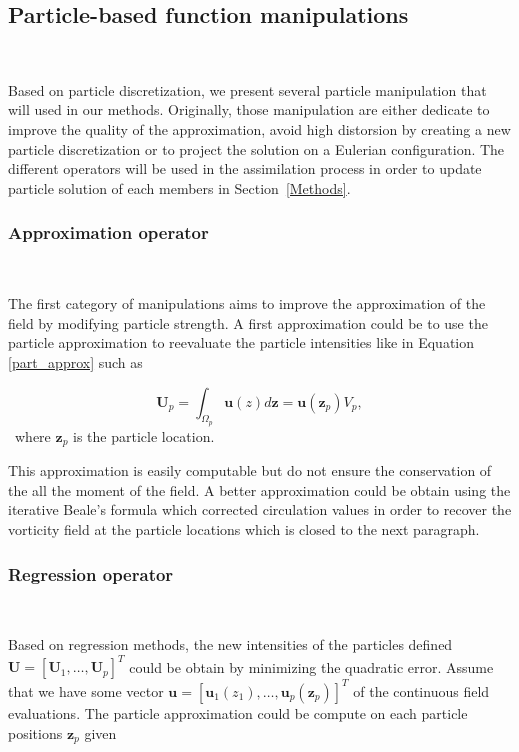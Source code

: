 \subsection{Particle-based function manipulations}~\label{operators}

Based on particle discretization, we present several particle manipulation that will used in our methods. Originally, those manipulation are either dedicate to improve the quality of the approximation, avoid high distorsion by creating a new particle discretization or to project the solution on a Eulerian configuration. The different operators will be used in the assimilation process in
order to update particle solution of each members in Section~\ref{Methods}.

\subsubsection{Approximation operator}~\label{interpOp}

The first category of manipulations aims to improve the approximation of the field by modifying particle strength.
A first approximation could be to use the particle approximation to reevaluate the particle intensities like in Equation \ref{part_approx} such as

\begin{equation*}
	\bm U_p = \int_{\Omega_p} \bm u(z) d\bm z = \bm u(\bm z_p) V_p,
\end{equation*}~where $\bm z_p$ is the particle location.

This approximation is easily computable but do not ensure the conservation of the all the moment of the field. A better approximation could be obtain using the iterative Beale's formula \cite{beale_accuracy_1988} which corrected circulation values in order to recover the vorticity field at the particle locations which is closed to the next paragraph.

\subsubsection{Regression operator}~\label{regressionOperator}

Based on regression methods, the new intensities of the particles defined $\bm{U} = [\bm U_1, \dots, \bm U_p]^T$ could be obtain by minimizing the quadratic error. Assume that we have some vector $\bm{u} = [\bm u_1(z_1), \dots, \bm u_p(\bm z_p)]^T$ of the continuous field evaluations. The particle approximation could be compute on each particle positions $\bm z_p$ given

